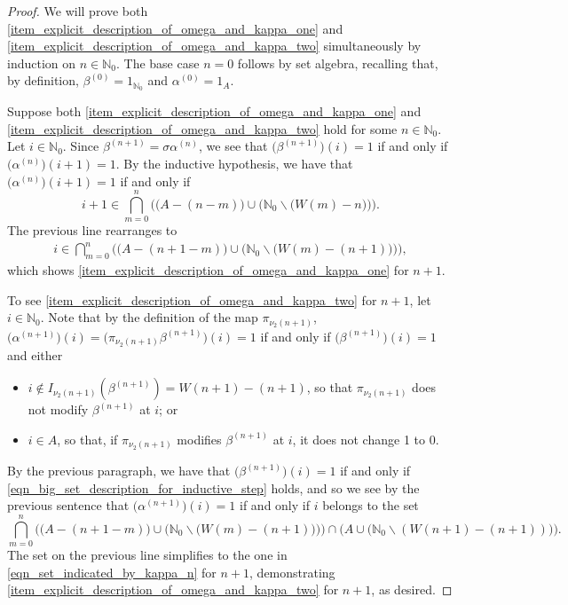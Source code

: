 \documentclass[letter,11pt]{article}
\theoremstyle{plain}
\theoremstyle{definition}
\theoremstyle{plain}
\theoremstyle{plain}
\numberwithin{equation}{section}
\newcommand{\N}{\mathbb{N}}
\renewcommand{\setminus}{\backslash}
\newcommand{\bpunch}{\beta}
\newcommand{\apunch}{\alpha}
\begin{document}
\begin{proof}
    We will prove both \eqref{item_explicit_description_of_omega_and_kappa_one} and \eqref{item_explicit_description_of_omega_and_kappa_two} simultaneously by induction on $n \in \N_0$. The base case $n=0$ follows by set algebra, recalling that, by definition, $\bpunch^{(0)} = 1_{\N_0}$ and $\apunch^{(0)} = 1_A$.
    
    Suppose both \eqref{item_explicit_description_of_omega_and_kappa_one} and \eqref{item_explicit_description_of_omega_and_kappa_two} hold for some $n \in \N_0$. Let $i \in \N_0$.  Since $\bpunch^{(n+1)} = \sigma \apunch^{(n)}$, we see that $\big(\bpunch^{(n+1)} \big)(i) = 1$ if and only if $\big(\apunch^{(n)} \big)(i+1) = 1$. By the inductive hypothesis, we have that $\big(\apunch^{(n)} \big)(i+1) = 1$ if and only if
    \[i+1 \in \bigcap_{m=0}^{n} \Big( \big( A - (n-m) \big) \cup \big( \N_0 \setminus \big( W(m)-n \big) \big) \Big).\]
    The previous line rearranges to
    \begin{align}
    \label{eqn_big_set_description_for_inductive_step}
        i \in \bigcap_{m=0}^{n} \Big( \big( A - (n+1-m) \big) \cup \big( \N_0 \setminus \big( W(m)-(n+1) \big) \big) \Big),
    \end{align}
    which shows \eqref{item_explicit_description_of_omega_and_kappa_one} for $n+1$.

    To see \eqref{item_explicit_description_of_omega_and_kappa_two} for $n+1$, let $i \in \N_0$. Note that by the definition of the map $\pi_{\nu_2(n+1)}$, $\big(\apunch^{(n+1)} \big)(i) = \big(\pi_{\nu_2(n+1)} \bpunch^{(n+1)} \big)(i) = 1$ if and only if $\big(\bpunch^{(n+1)}\big)(i) = 1$ and either
    \begin{itemize}
        \item $i \not\in I_{\nu_2(n+1)}(\bpunch^{(n+1)}) = W(n+1) - (n+1)$, so that $\pi_{\nu_2(n+1)}$ does not modify $\bpunch^{(n+1)}$ at $i$; or
        \item $i \in A$, so that, if $\pi_{\nu_2(n+1)}$ modifies $\bpunch^{(n+1)}$ at $i$, it does not change 1 to 0.
    \end{itemize}
    By the previous paragraph, we have that $\big(\bpunch^{(n+1)}\big)(i) = 1$ if and only if \eqref{eqn_big_set_description_for_inductive_step} holds, and so we see by the previous sentence that $\big(\apunch^{(n+1)} \big)(i) = 1$ if and only if $i$ belongs to the set
    \[\bigcap_{m=0}^{n} \Big( \big( A - (n+1-m) \big) \cup \big( \N_0 \setminus \big( W(m)-(n+1) \big) \big) \Big) \cap \big(A \cup \big(\N_0 \setminus (W(n+1)-(n+1))\big) \big).\]
    The set on the previous line simplifies to the one in \eqref{eqn_set_indicated_by_kappa_n} for $n+1$, demonstrating \eqref{item_explicit_description_of_omega_and_kappa_two} for $n+1$, as desired.
\end{proof}
\end{document}

